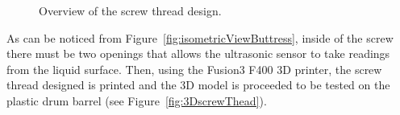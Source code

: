 \begin{figure}[h!]
    \centering
    \quad\quad\quad\quad\quad\quad
    \caption{Overview of the screw thread design.}
    \label{fig:buttressDesign}
\end{figure}

As can be noticed from Figure~\ref{fig:isometricViewButtress}, inside of the screw there must be two openings that allows the ultrasonic sensor to take readings from the liquid surface. Then, using the Fusion3 F400 3D printer, the screw thread designed is printed and the 3D model is proceeded to be tested on the plastic drum barrel (see Figure~\ref{fig:3DscrewThead}).

